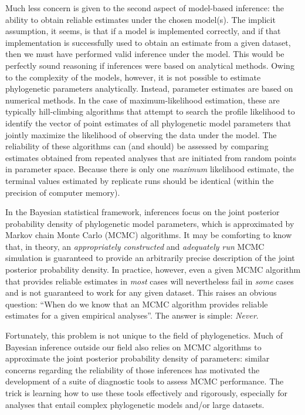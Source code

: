 Much less concern is given to the second aspect of model-based inference: the ability to obtain reliable estimates under the chosen model(s). 
The implicit assumption, it seems, is that if a model is implemented correctly, and if that implementation is  successfully used to obtain an estimate from a given dataset, then we must have performed valid inference under the model. 
This would be perfectly sound reasoning if inferences were based on analytical methods. 
Owing to the complexity of the models, however, it is not possible to estimate phylogenetic parameters analytically.
Instead, parameter estimates are based on numerical methods. In the case of maximum-likelihood estimation, these are typically hill-climbing algorithms that attempt to search the profile likelihood to identify the vector of point estimates of all phylogenetic model parameters that jointly maximize the likelihood of observing the data under the model. 
The reliability of these algorithms can (and should) be assessed by comparing estimates obtained from repeated analyses that are initiated from random points in parameter space. 
Because there is only one {\it maximum} likelihood estimate, the terminal values estimated by replicate runs should be identical (within the precision of computer memory).

In the Bayesian statistical framework, inferences focus on the joint posterior probability density of phylogenetic model parameters, which is approximated by Markov chain Monte Carlo (MCMC) algorithms. 
It may be comforting to know that, in theory, an {\it appropriately constructed} and {\it adequately run} MCMC simulation is guaranteed to provide an arbitrarily precise description of the joint posterior probability density. 
In practice, however, even a given MCMC algorithm that provides reliable estimates in {\it most} cases will nevertheless fail in {\it some} cases and is not guaranteed to work for any given dataset. 
This raises an obvious question: ``When do we know that an MCMC algorithm provides reliable estimates for a given empirical analyses''. The answer is simple: \emph{Never}.

Fortunately, this problem is not unique to the field of phylogenetics. 
Much of Bayesian inference outside our field also relies on MCMC algorithms to approximate the joint posterior probability density of parameters: similar concerns regarding the reliability of those inferences has motivated the development of a suite of diagnostic tools to assess MCMC performance. 
The trick is learning how to use these tools effectively and rigorously, especially for analyses that entail complex phylogenetic models and/or large datasets.

